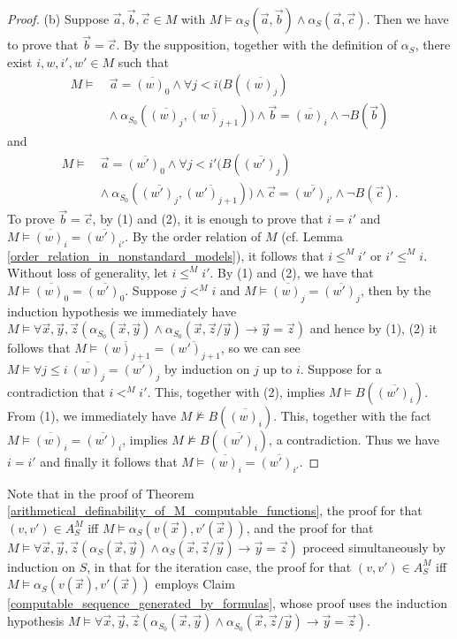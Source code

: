 \documentclass[a4paper,11pt]{article}
\begin{document}
\begin{proof}
(b) Suppose $\vec{a}, \vec{b}, \vec{c}\in M$ with $M \models\alpha_S(\vec{a},\vec{b}) \wedge \alpha_S(\vec{a},\vec{c})$. Then we have to prove that $\vec{b} = \vec{c}$. By the supposition, together with the definition of $\alpha_S$, there exist $i,w,i',w'\in M$ such that
\begin{align}
  M \models\ &\vec{a}=\overline{(w)_0} \wedge \forall j<i (B(\overline{(w)_j}) \nonumber \\
            &\wedge\: \alpha_{S_0}(\overline{(w)_j},\overline{(w)_{j+1}})) \wedge \vec{b} = \overline{(w)_i} \wedge \neg B(\vec{b}) \tag{1}
\end{align}
and
\begin{align}
  M \models\ & \vec{a}=\overline{(w')_0} \wedge \forall j<i' (B(\overline{(w')_j}) \nonumber \\
             & \wedge\: \alpha_{S_0}(\overline{(w')_j},\overline{(w')_{j+1}})) \wedge \vec{c} = \overline{(w')_{i'}} \wedge \neg B(\vec{c}). \tag{2}
\end{align}
To prove $\vec{b} = \vec{c}$, by (1) and (2), it is enough to prove that $i = i'$ and $M \models \overline{(w)_i}=\overline{(w')_{i'}}$. By the order relation of $M$ (cf. Lemma \ref{order_relation_in_nonstandard_models}), it follows that $i\leq^{M} i'$ or $i' \leq^{M} i$. Without loss of generality, let $i\leq^{M} i'$. By (1) and (2), we have that $M \models \overline{(w)_0}=\overline{(w')_0}$. Suppose $j <^{M} i$ and $M \models \overline{(w)_j}=\overline{(w')_j}$, then by the induction hypothesis we immediately have $M \models \forall \vec{x}, \vec{y},\vec{z}(\alpha_{S_0}(\vec{x},\vec{y})\wedge\alpha_{S_0}(\vec{x},\vec{z}/\vec{y}) \rightarrow \vec{y}=\vec{z})$ and hence by (1), (2) it follows that $M \models \overline{(w)_{j+1}}=\overline{(w')_{j+1}}$, so we can see $M \models \forall j \leq i\ \overline{(w)_j}=\overline{(w')_j}$ by induction on $j$ up to $i$. Suppose for a contradiction that $i <^{M} i'$. This, together with (2), implies $M \models B(\overline{(w')_i})$. From (1), we immediately have $M \not\models B(\overline{(w)_i})$. This, together with the fact $M \models \overline{(w)_i}=\overline{(w')_i}$, implies $M \not\models B(\overline{(w')_i})$, a contradiction. Thus we have $i = i'$ and finally it follows that $M \models \overline{(w)_i}=\overline{(w')_{i'}}$.
\end{proof}

Note that in the proof of Theorem \ref{arithmetical_definability_of_M_computable_functions}, the proof for that $(v,v')\in A_S^M$ iff $M \models \alpha_S(v(\vec{x}),v'(\vec{x}))$, and the proof for that $M \models \forall \vec{x},\vec{y},\vec{z}(\alpha_S(\vec{x},\vec{y})\wedge\alpha_S(\vec{x},\vec{z}/\vec{y})\rightarrow \vec{y}=\vec{z})$ proceed simultaneously by induction on $S$, in that for the iteration case, the proof for that $(v,v')\in A_S^M$ iff $M \models \alpha_S(v(\vec{x}),v'(\vec{x}))$ employs Claim \ref{computable_sequence_generated_by_formulas}, whose proof uses the induction hypothesis $M \models \forall \vec{x},\vec{y},\vec{z}(\alpha_{S_0}(\vec{x},\vec{y})\wedge\alpha_{S_0}(\vec{x},\vec{z}/\vec{y})\rightarrow \vec{y}=\vec{z})$.
\end{document}
